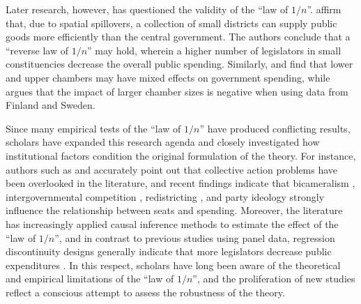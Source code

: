 \documentclass[11pt,a4paper,]{article}
\begin{document}
Later research, however, has questioned the validity of the ``law of
\(1/n\)''. \citet{primo2008distributive} affirm that, due to spatial
spillovers, a collection of small districts can supply public goods more
efficiently than the central government. The authors conclude that a
``reverse law of \(1/n\)'' may hold, wherein a higher number of
legislators in small constituencies decrease the overall public
spending. Similarly, \citet{primo2006stop} and \citet{chen2007law} find
that lower and upper chambers may have mixed effects on government
spending, while \citet{petterssonlidbom2012size} argues that the impact
of larger chamber sizes is negative when using data from Finland and
Sweden.

Since many empirical tests of the ``law of \(1/n\)'' have produced
conflicting results, scholars have expanded this research agenda and
closely investigated how institutional factors condition the original
formulation of the theory. For instance, authors such as
\citet{crowley2019law} and \citet{pecorino2018supermajority} accurately
point out that collective action problems have been overlooked in the
literature, and recent findings indicate that bicameralism
\citep{maldonado2013legislatures}, intergovernmental competition
\citep{crowley2015local}, redistricting \citep{lee2018court}, and party
ideology \citep{bjedov2014impact} strongly influence the relationship
between seats and spending. Moreover, the literature has increasingly
applied causal inference methods to estimate the effect of the ``law of
\(1/n\)'', and in contrast to previous studies using panel data,
regression discontinuity designs generally indicate that more
legislators decrease public expenditures
\citep{debenedetto2018effect, hohmann2017effect, lewis2019legislature, petterssonlidbom2012size}.
In this respect, scholars have long been aware of the theoretical and
empirical limitations of the ``law of \(1/n\)'', and the proliferation
of new studies reflect a conscious attempt to assess the robustness of
the theory.
\end{document}
